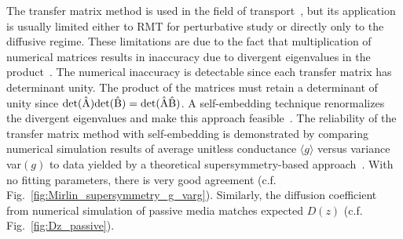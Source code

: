 The transfer matrix method is used in the field of transport~\cite{2007_Froufe-Perez_PRE}, but its application is usually limited either to RMT for perturbative study or directly only to the diffusive regime. These limitations are due to the fact that multiplication of numerical matrices results in inaccuracy due to divergent eigenvalues in the product~\cite{1968_Osedelec}.
The numerical inaccuracy is detectable since each transfer matrix has determinant unity. %
The product of the matrices must retain a determinant of unity since 
$\rm{det}(\hat{A})\rm{det}(\hat{B})=\rm{det}(\hat{A}\hat{B})$.
A self-embedding technique renormalizes the divergent eigenvalues and make this approach feasible~\cite{1999_yamilov_selfembed,1976_Bellman_Wing_embedding}.
The reliability of the transfer matrix method with self-embedding is demonstrated by comparing numerical simulation results of average unitless conductance $\langle g \rangle$ versus variance var$(g)$ to data yielded by a theoretical supersymmetry-based approach~\cite{2000_Mirlin}. With no fitting parameters, there is very good agreement (c.f. Fig.~\ref{fig:Mirlin_supersymmetry_g_varg}). Similarly, the diffusion coefficient from numerical simulation of passive media matches expected $D(z)$ (c.f. Fig.~\ref{fig:Dz_passive}).

